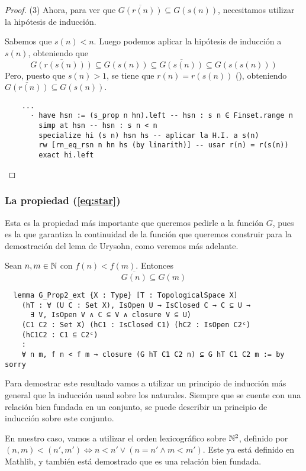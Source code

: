 \begin{proof}
  (3) Ahora, para ver que $\overline{G(r(n))} \subseteq G(s(n))$, necesitamos utilizar la hipótesis de inducción.

  Sabemos que $s(n) < n$. Luego podemos aplicar la hipótesis de inducción a $s(n)$, obteniendo que
  $$
  \overline{G(r(s(n)))} \subseteq G(s(n)) \subseteq \overline{G(s(n))} \subseteq G(s(s(n)))
  $$
  Pero, puesto que $s(n) >1$, se tiene que $r(n) = r(s(n))$ (), obteniendo $\overline{G(r(n))} \subseteq G(s(n))$.

  \begin{lstlisting}
    ...
      · have hsn := (s_prop n hn).left -- hsn : s n ∈ Finset.range n
        simp at hsn -- hsn : s n < n
        specialize hi (s n) hsn hs -- aplicar la H.I. a s(n)
        rw [rn_eq_rsn n hn hs (by linarith)] -- usar r(n) = r(s(n))
        exact hi.left \end{lstlisting}
\end{proof}

\subsubsection{La propiedad (\ref{eq:star})}

Esta es la propiedad más importante que queremos pedirle a la función $G$, pues es la que garantiza la continuidad de la función que queremos construir para la demostración del lema de Urysohn, como veremos más adelante.

\begin{lemma}
  Sean $n, m \in \mathbb{N}$ con $f(n) < f(m)$. Entonces
  $$
  \overline{G(n)} \subseteq G(m)
  $$
\end{lemma}

\begin{lstlisting}
  lemma G_Prop2_ext {X : Type} [T : TopologicalSpace X]
    (hT : ∀ (U C : Set X), IsOpen U → IsClosed C → C ⊆ U →
      ∃ V, IsOpen V ∧ C ⊆ V ∧ closure V ⊆ U)
    (C1 C2 : Set X) (hC1 : IsClosed C1) (hC2 : IsOpen C2ᶜ)
    (hC1C2 : C1 ⊆ C2ᶜ)
    :
    ∀ n m, f n < f m → closure (G hT C1 C2 n) ⊆ G hT C1 C2 m := by sorry
\end{lstlisting}

Para demostrar este resultado vamos a utilizar un principio de inducción más general que la inducción usual sobre los naturales. Siempre que se cuente con una relación bien fundada en un conjunto, se puede describir un principio de inducción sobre este conjunto.

En nuestro caso, vamos a utilizar el orden lexicográfico sobre $\mathbb{N}^2$, definido por $(n, m) < (n', m') \iff n<n' \lor (n=n' \land m<m')$. Este ya está definido en Mathlib, y también está demostrado que es una relación bien fundada.

